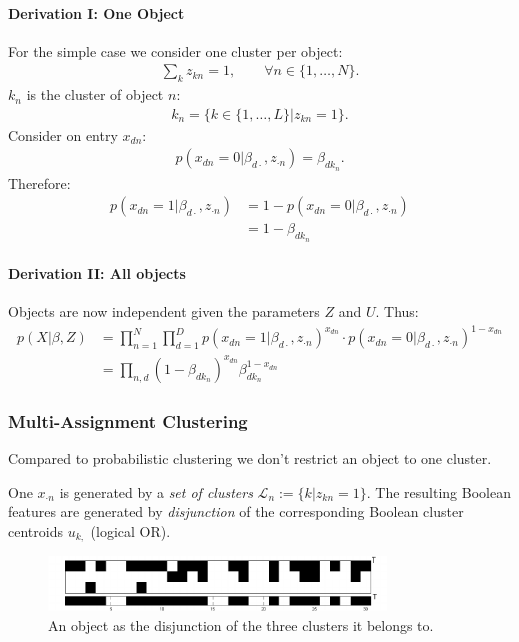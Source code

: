 \paragraph{Derivation I: One Object} For the simple case we consider one cluster per object:
\begin{align*}
\sum_k z_{kn} = 1, \qquad \forall n \in \{1, \ldots, N\}.
\end{align*}
$k_n$ is the cluster of object $n$: 
\begin{align*}
    k_{n} = \{ k\in \{1, \ldots, L\}| z_{kn} = 1\}.
\end{align*}
Consider on entry $x_{dn}$:
\begin{align*}
    p(x_{dn} = 0 | \beta_{d\cdot},z_{\cdot n}) = \beta_{dk_n}.
\end{align*}
Therefore:
\begin{align*}
    p(x_{dn} = 1 | \beta_{d\cdot},z_{\cdot n}) &=  1 - p(x_{dn} = 0 | \beta_{d\cdot},z_{\cdot n})\\
        &= 1-\beta_{dk_n}
\end{align*}

\paragraph{Derivation II: All objects} Objects are now independent given the parameters $Z$ and $U$. Thus:
\begin{align*}
    p(X|\beta,Z) &= \prod_{n=1}^N \prod_{d=1}^D p(x_{dn} = 1 | \beta_{d\cdot},z_{\cdot n})^{x_{dn}}\cdot p(x_{dn} = 0 | \beta_{d\cdot},z_{\cdot n})^{1-x_{dn}}\\
     &= \prod_{n,d} (1-\beta_{dk_n})^{x_{dn}} \beta_{dk_n}^{1-x_{dn}}
\end{align*}

\subsubsection{Multi-Assignment Clustering}
Compared to probabilistic clustering we don't restrict an object to one cluster.

One $x_{\cdot n}$ is generated by a \emph{set of clusters} $\mathcal L_n := \{k|z_{kn} = 1\}$. The resulting Boolean features are generated by \emph{disjunction} of the corresponding Boolean cluster centroids $u_{k,}$ (logical OR).
\begin{figure}[H]
    \centering
    \includegraphics[width=0.8\textwidth]{img/multi_assignment_clustering}
    \caption{An object as the disjunction of the three clusters it belongs to.}
\end{figure}

